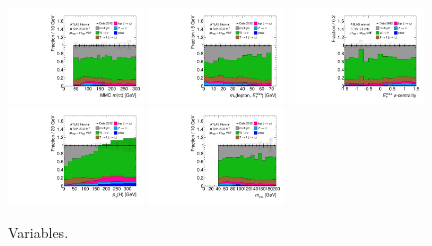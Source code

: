 \begin{figure}[tp]
  \includegraphics[width=0.32\textwidth]{figures/rx/vbf-mvaSR/mMMC}
  \includegraphics[width=0.32\textwidth]{figures/rx/vbf-mvaSR/mT}
  \includegraphics[width=0.32\textwidth]{figures/rx/vbf-mvaSR/met-phi-centrality}
  \includegraphics[width=0.32\textwidth]{figures/rx/vbf-mvaSR/H-pt-hi}
  \includegraphics[width=0.32\textwidth]{figures/rx/vbf-mvaSR/mvis}
  \caption{Variables.}
  \label{fig:backgrounds-rx-vbf-taus}
\end{figure}

\clearpage

